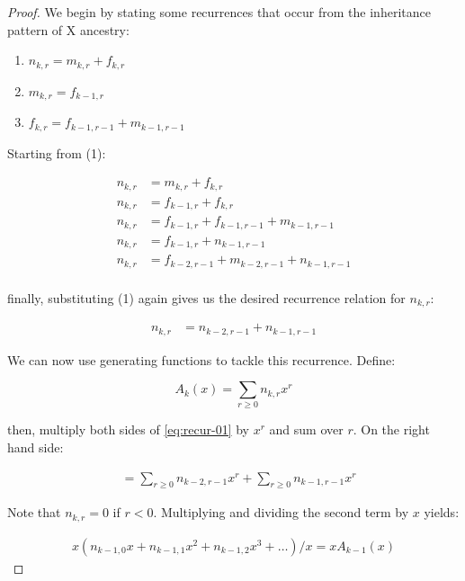 \documentclass[11pt]{article}
\begin{document}
\begin{proof}

 We begin by stating some recurrences that occur from the inheritance pattern of
 X ancestry:

\begin{enumerate}
  \item $ n_{k,r} = m_{k,r} + f_{k,r} $
  \item $ m_{k,r} = f_{k-1,r} $
  \item $ f_{k,r} = f_{k-1, r-1} + m_{k-1,r-1} $
\end{enumerate}

Starting from (1):

\begin{align} 
   n_{k,r} &= m_{k,r} + f_{k,r} \\
   n_{k,r} &= f_{k-1,r} + f_{k,r} \\
   n_{k,r} &= f_{k-1,r} + f_{k-1, r-1} + m_{k-1,r-1} \\
   n_{k,r} &= f_{k-1,r} + n_{k-1, r-1} \\
   n_{k,r} &= f_{k-2, r-1} + m_{k-2,r-1} + n_{k-1, r-1} \\
\end{align}

finally, substituting (1) again gives us the desired recurrence relation
for $n_{k,r}$:

\begin{align} \label{eq:recur-01}
   n_{k,r} &= n_{k-2, r-1} + n_{k-1, r-1}
\end{align}

We can now use generating functions \citep{wilf2013generatingfunctionology} to
tackle this recurrence. Define:

\begin{equation}
  A_k(x) = \sum_{r \ge 0} n_{k,r} x^r
\end{equation}

then, multiply both sides of \eqref{eq:recur-01} by $x^r$ and sum over $r$. On
the right hand side:

\begin{align}
  &= \sum_{r \ge 0} n_{k-2, r-1} x^r + \sum_{r \ge 0} n_{k-1, r-1} x^r
\end{align}

 Note that $n_{k,r} = 0$ if $r < 0$. Multiplying and dividing the second term by
 $x$ yields:

 \begin{align}
   x(n_{k-1, 0} x + n_{k-1, 1} x^2 + n_{k-1, 2} x^3 + \ldots)/x = x A_{k-1}(x) 
 \end{align}


\end{proof}
\end{document}
